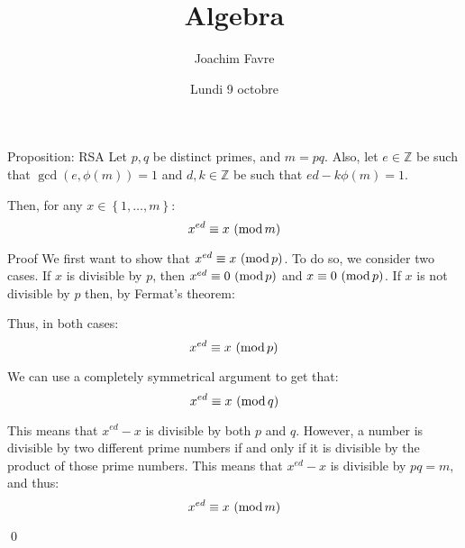 \documentclass[a4paper]{article}
\title{Algebra}
\author{Joachim Favre}
\date{Lundi 9 octobre}
\begin{document}
\maketitle


\begin{parag}{Proposition: RSA}
    Let $p, q$ be distinct primes, and $m = pq$. Also, let $e \in \mathbb{Z}$ be such that $\gcd\left(e, \phi\left(m\right)\right) = 1$ and $d,k \in \mathbb{Z}$ be such that $ed - k \phi\left(m\right) = 1$.

    Then, for any $x \in \left\{1, \ldots, m\right\}$: 
    \[x^{ed} \equiv x\ (\operatorname{mod} m)\]

    \begin{subparag}{Proof}
        We first want to show that $x^{ed} \equiv x\ (\operatorname{mod} p)$. To do so, we consider two cases. If $x$ is divisible by $p$, then $x^{ed} \equiv 0\ (\operatorname{mod} p)$ and $x \equiv 0\ (\operatorname{mod} p)$. If $x$ is not divisible by $p$ then, by Fermat's theorem: 
        
        Thus, in both cases: 
        \[x^{ed} \equiv x\ (\operatorname{mod} p)\]
        
        We can use a completely symmetrical argument to get that:
        \[x^{ed} \equiv x\ (\operatorname{mod} q)\]

        This means that $x^{ed}- x$ is divisible by both $p$ and $q$. However, a number is divisible by two different prime numbers if and only if it is divisible by the product of those prime numbers. This means that $x^{ed} - x$ is divisible by $pq = m$, and thus:
        \[x^{ed} \equiv x\ (\operatorname{mod} m)\]

        \qed
    \end{subparag}
\end{parag}
 
\end{document}
